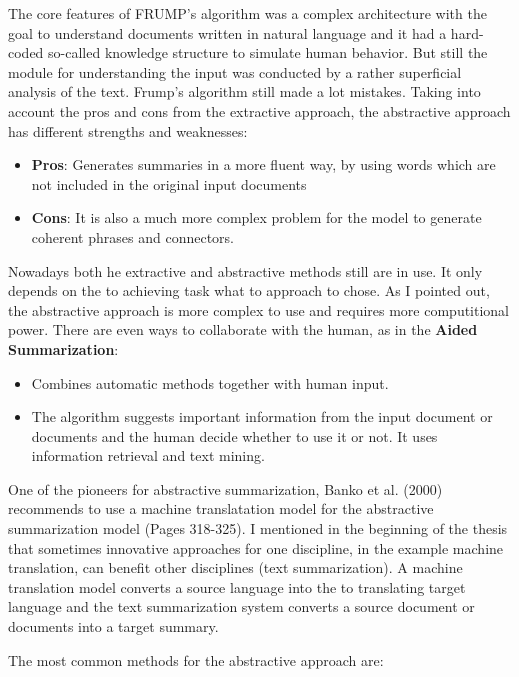The core features of FRUMP's algorithm was a complex architecture with the goal to understand documents written in natural language and it had a hard-coded so-called knowledge structure \cite{Dej82} to simulate human behavior. But still the module for understanding the input was conducted by a rather superficial analysis of the text. Frump's algorithm still made a lot mistakes. Taking into account the pros and cons from the extractive approach, the abstractive approach has different strengths and weaknesses:

\begin{itemize}
	\item \textbf{Pros}: Generates summaries in a more fluent way, by using words which are not included in the original input documents
	\item \textbf{Cons}: It is also a much more complex problem for the model to generate coherent phrases and connectors.
\end{itemize}


Nowadays both he extractive and abstractive methods still are in use. It only depends on the to achieving task what to approach to chose. As I pointed out, the abstractive approach is more complex to use and requires more computitional power. There are even ways to collaborate with the human, as in the \textbf{Aided Summarization}:

\begin{itemize}
	\item Combines automatic methods together with human input.
	\item The algorithm suggests important information from the input document or documents and the human decide whether to use it or not. It uses information retrieval and text mining.
\end{itemize}

One of the pioneers for abstractive summarization, Banko et al. (2000) recommends to use a machine translatation model for the abstractive summarization model \cite{banko-etal-2000-headline} (Pages 318-325). I mentioned in the beginning of the thesis that sometimes innovative approaches for one discipline, in the example machine translation, can benefit other disciplines (text summarization). A machine translation model converts a source language into the to translating target language and the text summarization system converts a source document or documents into a target summary.

The most common methods for the abstractive approach are:

